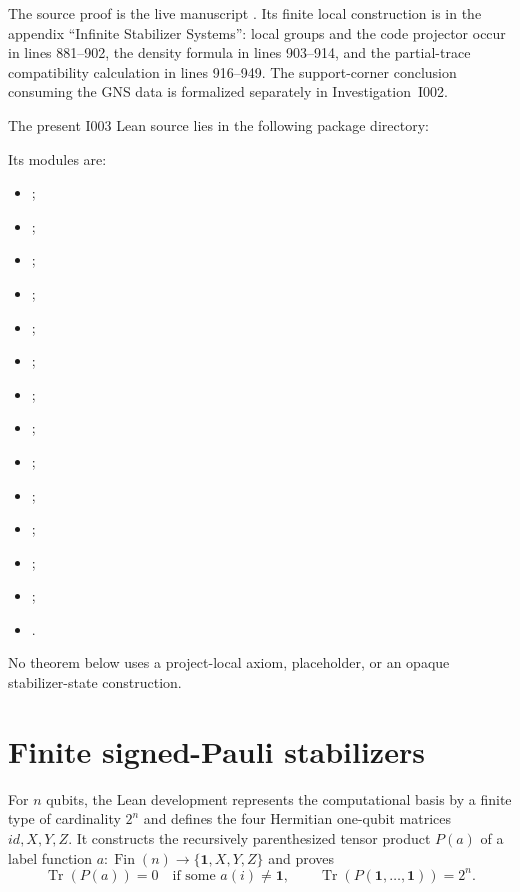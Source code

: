 \documentclass[11pt,reqno]{amsart}
\numberwithin{equation}{section}
\theoremstyle{definition}
\theoremstyle{remark}
\newcommand{\id}{\mathbf 1}
\newcommand{\Tr}{\operatorname{Tr}}
\begin{document}
The source proof is the live manuscript
.
Its finite local construction is in the appendix ``Infinite Stabilizer
Systems'': local groups and the code projector occur in lines 881--902, the
density formula in lines 903--914, and the partial-trace compatibility
calculation in lines 916--949.  The support-corner conclusion consuming the
GNS data is formalized separately in Investigation~I002.

The present I003 Lean source lies in the following package directory:
\begin{center}
\end{center}
Its modules are:
\begin{itemize}[noitemsep,topsep=0.2em]
  \item {};
  \item {};
  \item {};
  \item {};
  \item {};
  \item {};
  \item {};
  \item {};
  \item {};
  \item {};
  \item {};
  \item {};
  \item {};
  \item {}.
\end{itemize}
No
theorem below uses a project-local axiom,
placeholder, or an opaque stabilizer-state construction.

\section{Finite signed-Pauli stabilizers}
\label{sec:finite_stabilizers}

For $n$ qubits, the Lean development represents the computational basis by a
finite type of cardinality $2^n$ and defines the four Hermitian one-qubit
matrices $id,X,Y,Z$.  It constructs the recursively parenthesized tensor
product $P(a)$ of a label function $a:\operatorname{Fin}(n)\to
\{\id,X,Y,Z\}$ and proves
\begin{equation}
  \Tr(P(a))=0
  \quad\text{if some }a(i)\neq\id,
  \qquad
  \Tr(P(\id,\ldots,\id))=2^n.
  \label{eq:pauli_trace_orthogonality}
\end{equation}
\end{document}
